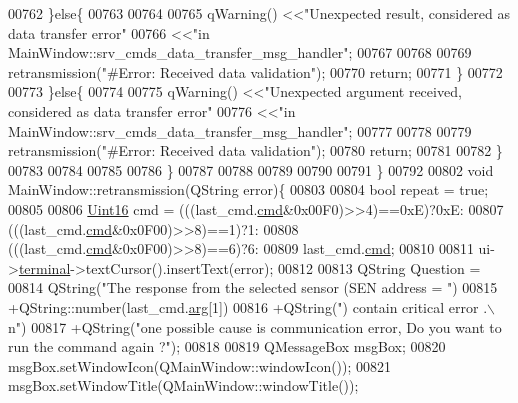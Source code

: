 \begin{DoxyCode}
{{{{{{{{{{{{{{{{{{{{00762                \}\textcolor{keywordflow}{else}\{
00763 
00764                    
00765                    qWarning() <<\textcolor{stringliteral}{"Unexpected result, considered as data transfer error"}
00766                               <<\textcolor{stringliteral}{"in MainWindow::srv\_cmds\_data\_transfer\_msg\_handler"};
00767                    
00768                    
00769                    retransmission(\textcolor{stringliteral}{"#Error: Received data  validation"});
00770                    \textcolor{keywordflow}{return};
00771                \}
00772 
00773            \}\textcolor{keywordflow}{else}\{
00774 
00775                qWarning() <<\textcolor{stringliteral}{"Unexpected argument received, considered as data transfer error"}
00776                           <<\textcolor{stringliteral}{"in MainWindow::srv\_cmds\_data\_transfer\_msg\_handler"};
00777                
00778                
00779                retransmission(\textcolor{stringliteral}{"#Error: Received data  validation"});
00780                \textcolor{keywordflow}{return};
00781 
00782            \}
00783 
00784 
00785 
00786          \}
00787 
00788 
00789     
00790 
00791 \}
00792 
00802 \textcolor{keywordtype}{void} MainWindow::retransmission(QString error)\{
00803 
00804     \textcolor{keywordtype}{bool} repeat = \textcolor{keyword}{true};
00805     
00806     \hyperlink{a00004_aae7407b021d43f7193a81a58cfb3e297}{Uint16} cmd = (((last\_cmd.\hyperlink{a00004_af20664dc9ca2b752c73d524edee0e07a}{cmd}&0x00F0)>>4)==0xE)?0xE:
00807                  (((last\_cmd.\hyperlink{a00004_af20664dc9ca2b752c73d524edee0e07a}{cmd}&0x0F00)>>8)==1)?1:
00808                  (((last\_cmd.\hyperlink{a00004_af20664dc9ca2b752c73d524edee0e07a}{cmd}&0x0F00)>>8)==6)?6:
00809                  last\_cmd.\hyperlink{a00004_af20664dc9ca2b752c73d524edee0e07a}{cmd};
00810     
00811     ui->\hyperlink{a00080_aae71c46ea4546df5994735dee573b2dd}{terminal}->textCursor().insertText(error);
00812 
00813     QString Question =
00814             QString(\textcolor{stringliteral}{"The response from the selected sensor (SEN address = "})
00815             +QString::number(last\_cmd.\hyperlink{a00004_a56e6c2d7315d0ae60a51e8b140c9cfe4}{arg}[1])
00816             +QString(\textcolor{stringliteral}{") contain critical error .\(\backslash\)n"})
00817             +QString(\textcolor{stringliteral}{"one possible cause is communication error, Do you want to run the command again ?"});
00818 
00819     QMessageBox msgBox;
00820     msgBox.setWindowIcon(QMainWindow::windowIcon());
00821     msgBox.setWindowTitle(QMainWindow::windowTitle());
}}}}}}}}}}}}}}}}}}}}
\end{DoxyCode}
